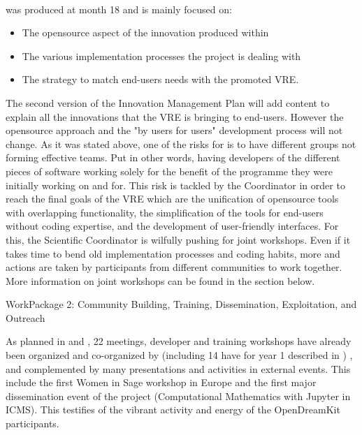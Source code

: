 \documentclass{deliverablereport}
\makeatletter
\renewcommand\subsubsection{\@startsection{subsubsection}{2}%
  \z@{.5\linespacing\@plus.7\linespacing}{.1\linespacing}%
  {\normalfont\bfseries}}
\makeatother
\begin{document}

\paragraph{}

 was produced at month 18 and is mainly focused on: 

\begin{itemize}
\item{The opensource aspect of the innovation produced within \ODK}
\item{The various implementation processes the project is dealing with}
\item{The strategy to match end-users needs with the promoted VRE}.
\end{itemize}

  The second version of the Innovation Management Plan will add content to explain all the
  innovations that the VRE is bringing to end-users. However the opensource approach and
  the "by users for users" development process will not change.  As it was stated above,
  one of the risks for \ODK is to have different groups not forming effective teams. Put
  in other words, having developers of the different pieces of software working solely for
  the benefit of the programme they were initially working on and for. This risk is
  tackled by the Coordinator in order to reach the final goals of the VRE which are the
  unification of opensource tools with overlapping functionality, the simplification of
  the tools for end-users without coding expertise, and the development of user-friendly
  interfaces. For this, the Scientific Coordinator is wilfully pushing for joint
  workshops. Even if it takes time to bend old implementation processes and coding habits,
  more and actions are taken by \ODK participants from different communities to work
  together. More information on joint workshops can be found in the section below.

\clearpage
  \subsubsection{WorkPackage 2:  Community Building, Training, Dissemination, Exploitation, and Outreach}

  As planned in  and
  , 22 meetings, developer and training workshops have already
  been organized and co-organized by \ODK (including 14 have for year 1 described in ) , and complemented by many
  presentations and activities in external events. This include the first Women in Sage workshop in Europe and the
  first major dissemination event of the project (Computational Mathematics with Jupyter in ICMS). This testifies
  of the vibrant activity and energy of the OpenDreamKit participants.
  
\end{document}
